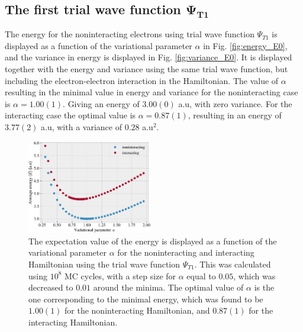 \documentclass[%
 reprint,
nofootinbib,
aps,
]{revtex4-1}
\begin{document}
\subsection{The first trial wave function $\boldsymbol{\Psi_{T1}}$}
The energy for the noninteracting electrons using trial wave function $\Psi_{T1}$ is displayed as a function of the variational parameter $\alpha$ in Fig. \vref{fig:energy_E0}, and the variance in energy is displayed in Fig. \vref{fig:variance_E0}. It is displayed together with the energy and variance using the same trial wave function, but including the electron-electron interaction in the Hamiltonian. The value of $\alpha$ resulting in the minimal value in energy and variance for the noninteracting case is $\alpha=1.00(1)$. Giving an energy of $3.00(0)$ a.u, with zero variance.
For the interacting case the optimal value is $\alpha=0.87(1)$, resulting in an energy of $3.77(2)$ a.u, with a variance of $0.28$ a.u$^2$.\par


\begin{figure}
  \centering
  \includegraphics[width=0.485\textwidth]{../figures/energy_c.pdf}
  \caption{The expectation value of the energy is displayed as a function of the variational parameter $\alpha$ for the noninteracting and interacting Hamiltonian using the trial wave function $\Psi_{T1}$. This was calculated using $10^8$ MC cycles, with a step size for $\alpha$ equal to $0.05$, which was decreased to $0.01$ around the minima. The optimal value of $\alpha$ is the one corresponding to the minimal energy, which was found to be $1.00(1)$ for the noninteracting Hamiltonian, and $0.87(1)$ for the interacting Hamiltonian.}
  \label{fig:energy_E0}
\end{figure}
\end{document}
